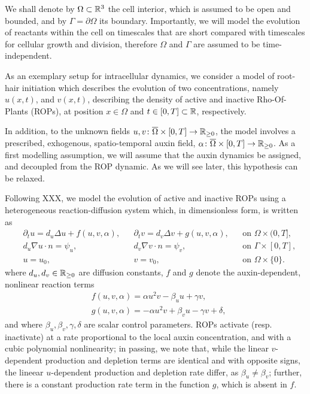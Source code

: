 \documentclass[a4paper]{siamonline220329}
\begin{document}
We shall denote by $\Omega \subset \mathbb{R}^3$ the cell interior, which is assumed to be
open and bounded, and by $\Gamma = \partial \Omega$ its boundary.  Importantly, we will model the evolution of
reactants within the cell on timescales that are short compared with timescales for
cellular growth and division, therefore $\Omega$ and $\Gamma$ are assumed to be
time-independent.

As an exemplary setup for intracellular dynamics, we consider a model of root-hair
initiation which describes the evolution of two concentrations, namely $u(x,t)$, and
$v(x,t)$, describing the density of active and inactive Rho-Of-Plants (ROPs), at
position $x \in \Omega$ and $t \in [0,T] \subset \mathbb{R}$, respectively.  

In addition, to the unknown fields $u,v \colon \overline{\Omega} \times [0,T] \to
\mathbb{R}_{ \geq  0}$, the model involves a prescribed, exhogenous, spatio-temporal auxin
field, $\alpha \colon \overline{\Omega} \times [0,T] \to \mathbb{R}_{ \geq  0}$. As a
first modelling assumption, we will assume that the auxin dynamics be assigned, and
decoupled from the ROP dynamic. As we will see later, this hypothesis can be relaxed.

Following XXX, we model the evolution of active and inactive ROPs using a
heterogeneous reaction-diffusion system which, in dimensionless form, is written
as
  \begin{align}
    & \partial_t u = d_u \Delta u + f(u,v,\alpha), 
      && \partial_t v = d_v \Delta v + g(u,v,\alpha), 
      && \text{on $\Omega\times (0,T]$,} \label{eq:RDEs}\\
    & d_u \nabla u \cdot n = \psi_u, 
      && d_v \nabla v \cdot n = \psi_v, 
      && \text{on $\Gamma \times [0,T]$,} \label{eq:BCs}\\
    & u = u_0,  && v = v_0, && \text{on $\Omega \times \{0\}$.} \label{eq:ICs}
  \end{align}
where $d_u, d_v \in \mathbb{R}_{ \geq 0}$ are diffusion constants, $f$ and $g$  denote the auxin-dependent, nonlinear
reaction terms
\[
  \begin{aligned}
   & f(u,v,\alpha) = \alpha u^2 v - \beta_u u + \gamma v, \\
   & g(u,v,\alpha) = -\alpha u^2 v + \beta_v u - \gamma v + \delta,
  \end{aligned}
\]
and where $\beta_u, \beta_v, \gamma, \delta$ are scalar control parameters. ROPs
activate (resp. inactivate) at a rate proportional to the local auxin concentration,
and with a cubic polynomial nonlinearity; in passing, we note that, while the
linear $v$-dependent production and depletion terms are identical and with opposite signs,
the lineear $u$-dependent production and depletion rate differ, as $\beta_u \neq
\beta_v$; further, there is a constant production rate term in the function $g$,
which is absent in $f$. 
\end{document}
